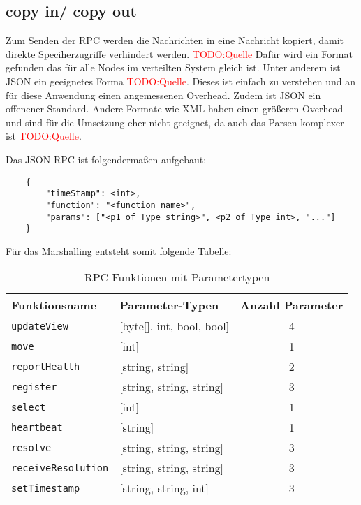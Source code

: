 \subsection{copy in/ copy out}
Zum Senden der RPC werden die Nachrichten in eine Nachricht kopiert, damit direkte Speciherzugriffe verhindert werden.  \textcolor{red}{TODO:Quelle} Dafür wird ein Format gefunden das für alle Nodes im verteilten System gleich ist. Unter anderem ist JSON ein geeignetes Forma  \textcolor{red}{TODO:Quelle}.  Dieses ist einfach zu verstehen und an für diese Anwendung einen angemessenen Overhead. Zudem ist JSON ein offenener Standard. Andere Formate wie XML haben einen größeren Overhead und sind für die Umsetzung eher nicht geeignet, da auch das Parsen komplexer ist  \textcolor{red}{TODO:Quelle}.  


Das JSON-RPC ist folgendermaßen aufgebaut:

\begin{verbatim}
	{
		"timeStamp": <int>,
		"function": "<function_name>",
		"params": ["<p1 of Type string>", <p2 of Type int>, "..."]
	}
\end{verbatim}


Für das Marshalling entsteht somit folgende Tabelle:


\begin{table}[h!]
	\centering
	\begin{tabular}{|l|l|c|}
		\hline
		\textbf{Funktionsname} & \textbf{Parameter-Typen} & \textbf{Anzahl Parameter} \\
		\hline
		\texttt{updateView} & [byte[], int, bool, bool] & 4 \\
		\texttt{move} & [int] & 1 \\
		\texttt{reportHealth} & [string, string] & 2 \\
		\texttt{register} & [string, string, string] & 3 \\
		\texttt{select} & [int] & 1 \\
		\texttt{heartbeat} & [string] & 1 \\
		\texttt{resolve} & [string, string, string] & 3 \\
		\texttt{receiveResolution} & [string, string, string] & 3 \\
		\texttt{setTimestamp} & [string, string, int] & 3 \\
		
		\hline
	\end{tabular}
	\caption{RPC-Funktionen mit Parametertypen}
\end{table}

